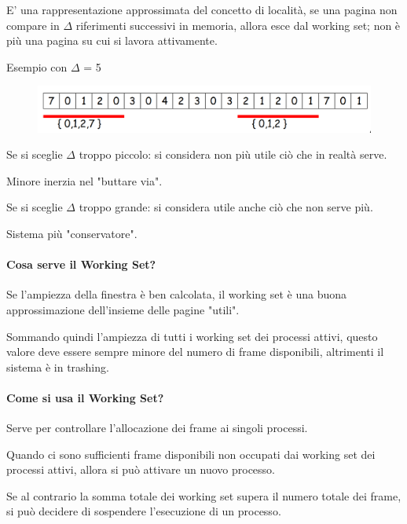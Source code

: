 E' una rappresentazione approssimata del concetto di località, se una pagina non compare in $\Delta$ riferimenti successivi in memoria, allora esce dal working set; non è più una pagina su cui si lavora attivamente.
\newline


Esempio con $\Delta$ = 5

\begin{figure} [h]
        \centering
        \includegraphics[width=0.6\linewidth]{Images/Screenshot 2025-01-17 at 18-38-59 so-05-memoria - so-05-memoria.pdf.png}
    \end{figure}


Se si sceglie $\Delta$ troppo piccolo: si considera non più utile ciò che in realtà serve. 

Minore inerzia nel "buttare via".

Se si sceglie $\Delta$ troppo grande: si considera utile anche ciò che non serve più. 

Sistema più "conservatore".

\paragraph{Cosa serve il Working Set?}
Se l'ampiezza della finestra è ben calcolata, il working set è una
buona approssimazione dell'insieme delle pagine "utili".

Sommando quindi l'ampiezza di tutti i working set dei processi
attivi, questo valore deve essere sempre minore del numero di
frame disponibili, altrimenti il sistema è in trashing.

\paragraph{Come si usa il Working Set?}
Serve per controllare l'allocazione dei frame ai singoli processi. 

Quando ci sono sufficienti frame disponibili non occupati dai
working set dei processi attivi, allora si può attivare un nuovo
processo.

Se al contrario la somma totale dei working set supera il numero totale dei frame, si può decidere di sospendere l'esecuzione di un processo.

